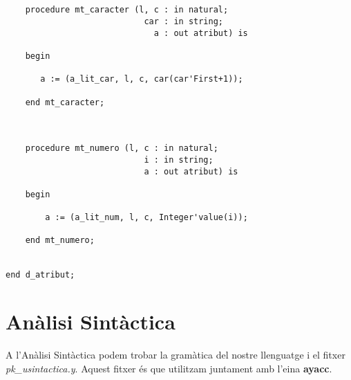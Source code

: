 \documentclass[10pt]{report}
\begin{document}
\begin{lstlisting}[style=Ada]
    

    procedure mt_caracter (l, c : in natural; 
                            car : in string; 
                              a : out atribut) is
    
    begin
    
       a := (a_lit_car, l, c, car(car'First+1));
       
    end mt_caracter;
        
        
        
    procedure mt_numero (l, c : in natural; 
                            i : in string; 
                            a : out atribut) is
    
    begin
    
        a := (a_lit_num, l, c, Integer'value(i));
        
    end mt_numero;
    

end d_atribut;
    \end{lstlisting}
    \newpage
    
    
    \chapter{Anàlisi Sintàctica}
    A l'Anàlisi Sintàctica podem trobar la gramàtica del nostre llenguatge i el fitxer \textit{pk\_usintactica.y}. Aquest fitxer és que utilitzam juntament amb l'eina \textbf{ayacc}.
    
\end{document}
